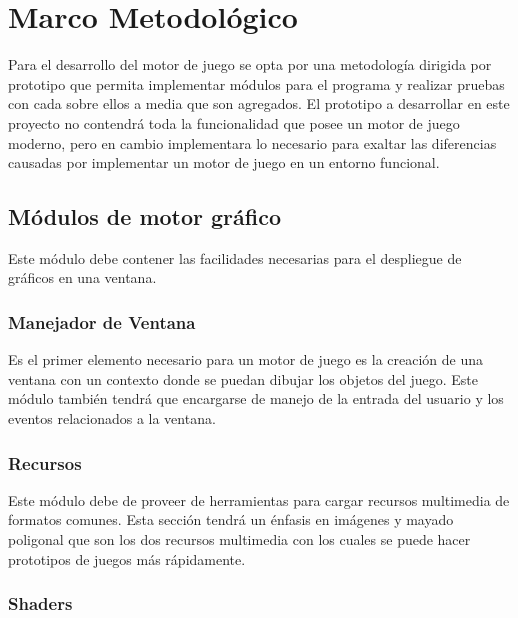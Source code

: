 
\chapter{Marco Metodológico}  %

\ifpdf
    \graphicspath{{metodologia/Figs/Raster/}{metodologia/Figs/PDF/}{metodologia/Figs/}}
\else
    \graphicspath{{metodologia/Figs/Vector/}{metodologia/Figs/}}
\fi

Para el desarrollo del motor de juego se opta por una metodología dirigida por prototipo que permita implementar módulos para el programa y realizar pruebas con cada sobre ellos a media que son agregados. El prototipo a desarrollar en este proyecto no contendrá toda la funcionalidad que posee un motor de juego moderno, pero en cambio implementara lo necesario para exaltar las diferencias causadas por implementar un motor de juego en un entorno funcional.

\section{Módulos de motor gráfico}

Este módulo debe contener las facilidades necesarias para el despliegue de gráficos en una ventana.

\subsection{Manejador de Ventana}

Es el primer elemento necesario para un motor de juego es la creación de una ventana con un contexto donde se puedan dibujar los objetos del juego. Este módulo también tendrá que encargarse de manejo de la entrada del usuario y los eventos relacionados a la ventana.

\subsection{Recursos}

Este módulo debe de proveer de herramientas para cargar recursos multimedia de formatos comunes. Esta sección tendrá un énfasis en imágenes y mayado poligonal que son los dos recursos multimedia con los cuales se puede hacer prototipos de juegos más rápidamente.

\subsection{Shaders}

